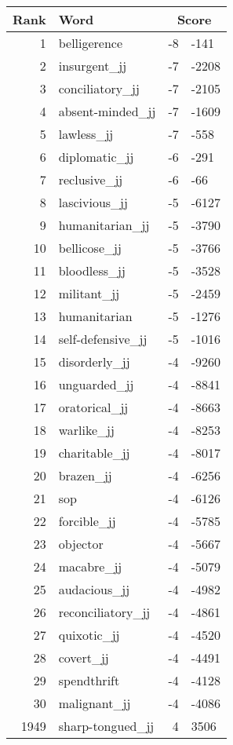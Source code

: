 \begin{longtable}[!htbp]{| rlr@{.}l |}
    \hline
    \textbf{Rank} & \textbf{Word} & \multicolumn{2}{c|}{\textbf{Score}} \\
    \hline
    \endhead
    1 & belligerence & -8 & -141 \\
    2 & insurgent\_jj & -7 & -2208 \\
    3 & conciliatory\_jj & -7 & -2105 \\
    4 & absent-minded\_jj & -7 & -1609 \\
    5 & lawless\_jj & -7 & -558 \\
    6 & diplomatic\_jj & -6 & -291 \\
    7 & reclusive\_jj & -6 & -66 \\
    8 & lascivious\_jj & -5 & -6127 \\
    9 & humanitarian\_jj & -5 & -3790 \\
    10 & bellicose\_jj & -5 & -3766 \\
    11 & bloodless\_jj & -5 & -3528 \\
    12 & militant\_jj & -5 & -2459 \\
    13 & humanitarian & -5 & -1276 \\
    14 & self-defensive\_jj & -5 & -1016 \\
    15 & disorderly\_jj & -4 & -9260 \\
    16 & unguarded\_jj & -4 & -8841 \\
    17 & oratorical\_jj & -4 & -8663 \\
    18 & warlike\_jj & -4 & -8253 \\
    19 & charitable\_jj & -4 & -8017 \\
    20 & brazen\_jj & -4 & -6256 \\
    21 & sop & -4 & -6126 \\
    22 & forcible\_jj & -4 & -5785 \\
    23 & objector & -4 & -5667 \\
    24 & macabre\_jj & -4 & -5079 \\
    25 & audacious\_jj & -4 & -4982 \\
    26 & reconciliatory\_jj & -4 & -4861 \\
    27 & quixotic\_jj & -4 & -4520 \\
    28 & covert\_jj & -4 & -4491 \\
    29 & spendthrift & -4 & -4128 \\
    30 & malignant\_jj & -4 & -4086 \\
    1949 & sharp-tongued\_jj & 4 & 3506 \\

\end{longtable}
